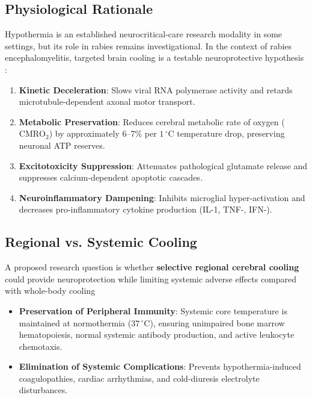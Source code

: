 \documentclass[12pt,a4paper]{article}
\begin{document}
\subsection{Physiological Rationale}

Hypothermia is an established neurocritical-care research modality in some settings, but its role in rabies remains investigational. In the context of rabies encephalomyelitis, targeted brain cooling is a testable neuroprotective hypothesis \citep{jackson2011therapy}:
\begin{enumerate}
    \item \textbf{Kinetic Deceleration}: Slows viral RNA polymerase activity and retards microtubule-dependent axonal motor transport.
    \item \textbf{Metabolic Preservation}: Reduces cerebral metabolic rate of oxygen ($\mathrm{CMRO}_2$) by approximately 6--7\% per $1\,^{\circ}\mathrm{C}$ temperature drop, preserving neuronal ATP reserves.
    \item \textbf{Excitotoxicity Suppression}: Attenuates pathological glutamate release and suppresses calcium-dependent apoptotic cascades.
    \item \textbf{Neuroinflammatory Dampening}: Inhibits microglial hyper-activation and decreases pro-inflammatory cytokine production (IL-1\textbeta{}, TNF-\textalpha{}, IFN-\textgamma{}).
\end{enumerate}

\subsection{Regional vs. Systemic Cooling}

A proposed research question is whether \textbf{selective regional cerebral cooling} could provide neuroprotection while limiting systemic adverse effects compared with whole-body cooling

\begin{itemize}
    \item \textbf{Preservation of Peripheral Immunity}: Systemic core temperature is maintained at normothermia ($37\,^{\circ}\mathrm{C}$), ensuring unimpaired bone marrow hematopoiesis, normal systemic antibody production, and active leukocyte chemotaxis.
    \item \textbf{Elimination of Systemic Complications}: Prevents hypothermia-induced coagulopathies, cardiac arrhythmias, and cold-diuresis electrolyte disturbances.
\end{itemize}
\end{document}
